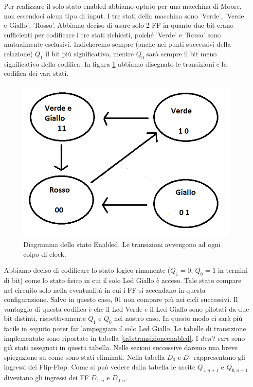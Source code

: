 \documentclass[10pt,a4paper]{article}
\begin{document}
Per realizzare il solo stato enabled abbiamo optato per una macchina di Moore, non essendoci alcun tipo di input. I tre stati della macchina sono 'Verde', 'Verde e Giallo', 'Rosso'. Abbiamo deciso di usare solo 2 FF in quanto due bit erano sufficienti per codificare i tre stati richiesti, poiché 'Verde' e 'Rosso' sono mutualmente esclusivi. Indicheremo sempre (anche nei punti successivi della relazione) $Q_1$ il bit più significativo, mentre $Q_0$ sarà sempre il bit meno significativo della codifica. In figura \ref{fig:FSMenabled} abbiamo disegnato le transizioni e la codifica dei vari stati.
\begin{figure}[!htb]
\centering
\includegraphics[scale=0.7]{FSMenabled.png}
\caption{Diagramma dello stato Enabled. Le transizioni avvengono ad ogni colpo di clock.\label{fig:FSMenabled}}
\end{figure}
Abbiamo deciso di codificare lo stato logico rimanente ($Q_1 = 0$, $Q_0 = 1$ in termini di bit) come lo stato fisico in cui il solo Led Giallo è acceso. Tale stato compare nel circuito solo nella eventualità in cui i FF si accendano in questa configurazione. Salvo in questo caso, 01 non compare più nei cicli successivi.
Il vantaggio di questa codifica è che il Led Verde e il Led Giallo sono pilotati da due bit distinti, rispettivamente $Q_1$ e $Q_0$ nel nostro caso. In questo modo ci sarà più facile in seguito poter far lampeggiare il solo Led Giallo.
Le tabelle di transizione implementate sono riportate in tabella \ref{tab:transizioneenabled}. I \emph{don't care} sono già stati assegnati in questa tabella. Nelle sezioni successive daremo una breve spiegazione su come sono stati eliminati. Nella tabella $D_0$ e $D_1$ rappresentano gli ingressi dei Flip-Flop. Come si può vedere dalla tabella le uscite $Q_{1,n+1}$ e $Q_{0,n+1}$ diventano gli ingressi dei FF $D_{1, n}$ e $D_{0, n}$.
\end{document}
